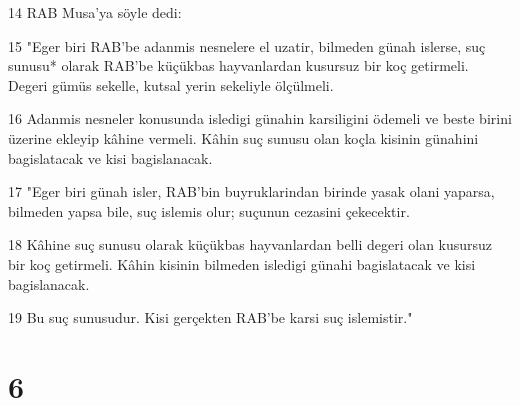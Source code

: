 \par 14 RAB Musa'ya söyle dedi:
\par 15 "Eger biri RAB'be adanmis nesnelere el uzatir, bilmeden günah islerse, suç sunusu* olarak RAB'be küçükbas hayvanlardan kusursuz bir koç getirmeli. Degeri gümüs sekelle, kutsal yerin sekeliyle ölçülmeli.
\par 16 Adanmis nesneler konusunda isledigi günahin karsiligini ödemeli ve beste birini üzerine ekleyip kâhine vermeli. Kâhin suç sunusu olan koçla kisinin günahini bagislatacak ve kisi bagislanacak.
\par 17 "Eger biri günah isler, RAB'bin buyruklarindan birinde yasak olani yaparsa, bilmeden yapsa bile, suç islemis olur; suçunun cezasini çekecektir.
\par 18 Kâhine suç sunusu olarak küçükbas hayvanlardan belli degeri olan kusursuz bir koç getirmeli. Kâhin kisinin bilmeden isledigi günahi bagislatacak ve kisi bagislanacak.
\par 19 Bu suç sunusudur. Kisi gerçekten RAB'be karsi suç islemistir."

\chapter{6}

